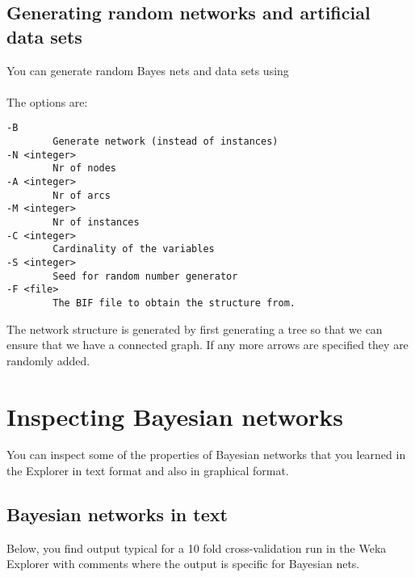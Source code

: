 \documentclass[a4paper]{article}
\begin{document}
\subsection*{Generating random networks and artificial data sets}

You can generate random Bayes nets and data sets using \\
 \\
The options are:
\begin{verbatim}
-B
        Generate network (instead of instances)
-N <integer>
        Nr of nodes
-A <integer>
        Nr of arcs
-M <integer>
        Nr of instances
-C <integer>
        Cardinality of the variables
-S <integer>
        Seed for random number generator
-F <file>
        The BIF file to obtain the structure from.
\end{verbatim}

The network structure is generated by first generating a tree so that we can
ensure that we have a connected graph. If any more arrows are specified they are
randomly added.


\section{Inspecting Bayesian networks}

You can inspect some of the properties of Bayesian networks that you learned
in the Explorer in text format and also in graphical format.
  
\subsection*{Bayesian networks in text}

Below, you find output typical for a 10 fold cross-validation run in the Weka
Explorer with comments where the output is specific for Bayesian nets. 

\end{document}
